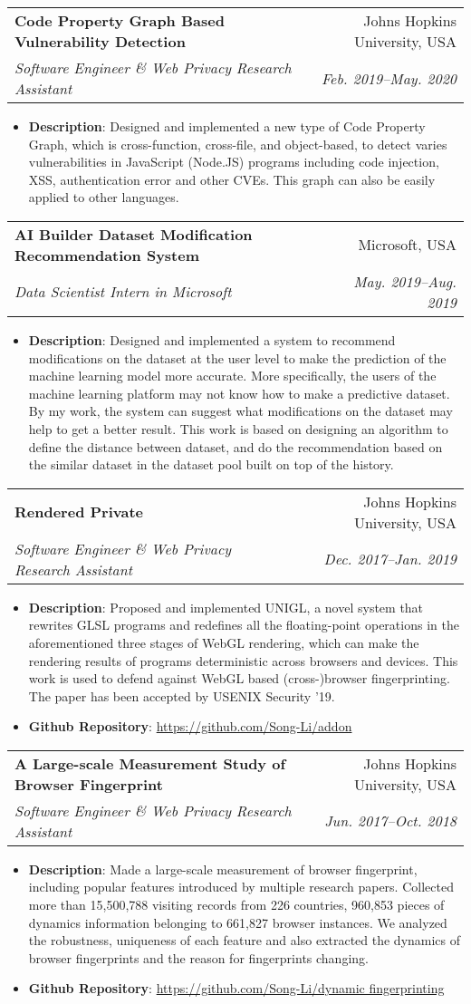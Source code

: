 \documentclass[letterpaper,11pt]{article}
\makeatletter
\newcommand{\resumeItem}[2]{
  \item\small{
    \textbf{#1}{: #2 \vspace{-2pt}}
  }
}
\newcommand{\resumeSubheading}[4]{
  \vspace{-1pt}\item
    \begin{tabular*}{0.97\textwidth}{l@{\extracolsep{\fill}}r}
      \textbf{#1} & #2 \\
      \textit{\small#3} & \textit{\small #4} \\
    \end{tabular*}\vspace{-5pt}
}
\newcommand{\resumeItemListStart}{\begin{itemize}}
\newcommand{\resumeItemListEnd}{\end{itemize}\vspace{-5pt}}
\makeatother
\begin{document}
       \resumeSubheading
  {Code Property Graph Based Vulnerability Detection}
  {Johns Hopkins University, USA}
  {Software Engineer \& Web Privacy Research Assistant}
  {Feb. 2019–May. 2020}
  \resumeItemListStart
  \resumeItem{Description}
  { Designed and implemented a new type of Code Property Graph, which is cross-function, cross-file, and object-based, to detect varies vulnerabilities in JavaScript (Node.JS) programs including code injection, XSS, authentication error and other CVEs. This graph can also be easily applied to other languages.}    
  \resumeItemListEnd
     \resumeSubheading
  {AI Builder Dataset Modification Recommendation System}
  {Microsoft, USA}
  {Data Scientist Intern in Microsoft}
  {May. 2019–Aug. 2019}
  \resumeItemListStart
  \resumeItem{Description}
  { Designed and implemented a system to recommend modifications on the dataset at the user level to make the prediction of the machine learning model more accurate. More specifically, the users of the machine learning platform may not know how to make a predictive dataset. By my work, the system can suggest what modifications on the dataset may help to get a better result. This work is based on designing an algorithm to define the distance between dataset, and do the recommendation based on the similar dataset in the dataset pool built on top of the history.}    
  \resumeItemListEnd
     \resumeSubheading
  {Rendered Private}
  {Johns Hopkins University, USA}
  {Software Engineer \& Web Privacy Research Assistant}
  {Dec. 2017–Jan. 2019}
  \resumeItemListStart
  \resumeItem{Description}
  { Proposed and implemented UNIGL, a novel system that rewrites GLSL programs and redefines all the floating-point operations in the aforementioned three stages of WebGL rendering, which can make the rendering results of programs deterministic across browsers and devices. This work is used to defend against WebGL based (cross-)browser fingerprinting. The paper has been accepted by USENIX Security '19.}    
  \resumeItem{Github Repository}
  {\url{https://github.com/Song-Li/addon}}
  \resumeItemListEnd
  
   \resumeSubheading
  {A Large-scale Measurement Study of Browser Fingerprint}
  {Johns Hopkins University, USA}
  {Software Engineer \& Web Privacy Research Assistant}
  {Jun. 2017–Oct. 2018}
  \resumeItemListStart
  \resumeItem{Description}
  { Made a large-scale measurement of browser fingerprint, including popular features introduced by
  	multiple research papers. Collected more than 15,500,788 visiting records from 226 countries, 960,853 pieces of
  	dynamics information belonging to 661,827 browser instances. We analyzed the robustness, uniqueness of each
  	feature and also extracted the dynamics of browser fingerprints and the reason for fingerprints changing.}    
  \resumeItem{Github Repository}
  {\url{https://github.com/Song-Li/dynamic fingerprinting}}
  \resumeItemListEnd
\end{document}
